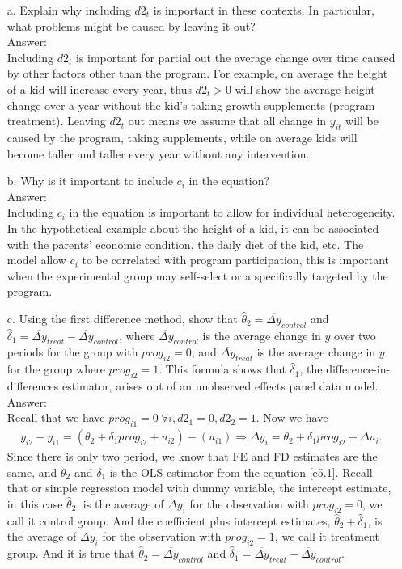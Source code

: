 \documentclass[10pt]{article}
\begin{document}
\begin{enumerate}
\item[a.] Explain why including $d2_t$ is important in these contexts. In particular, what problems might be caused by leaving it out? 
\\ Answer: \\
Including $d2_t$ is important for partial out the average change over time caused by other factors other than the program. For example, on average the height of a kid will increase every year, thus $d2_t>0$ will show the average height change over a year without the kid's taking growth supplements (program treatment). Leaving $d2_t$ out means we assume that all change in $y_{it}$ will be caused by the program, taking supplements, while on average kids will become taller and taller every year without any intervention.

\item[b.] Why is it important to include $c_i$ in the equation?
\\ Answer: \\
Including $c_i$ in the equation is important to allow for individual heterogeneity. In the hypothetical example about the height of a kid, it can be associated with the parents' economic condition, the daily diet of the kid, etc. The model allow $c_i$ to be correlated with program participation, this is important when the experimental group may self-select or a specifically targeted by the program.

\item[c.] Using the first difference method, show that $\hat{\theta}_2=\overline{\Delta y}_{control}$ and $\hat{\delta}_1=\overline{\Delta y}_{treat}-\overline{\Delta y}_{control}$, where $\overline{\Delta y}_{control}$ is the average change in $y$ over two periods for the group with $prog_{i2}=0$, and $\overline{\Delta y}_{treat}$ is the average change in $y$ for the group where $prog_{i2}=1$. This formula shows that $\hat{\delta}_1$, the difference-in-differences estimator, arises out of an unobserved effects panel data model.
\\ Answer: \\
Recall that we have $prog_{i1}=0\ \forall i, d2_1=0, d2_2=1.$ Now we have
\begin{align}
    y_{i2}-y_{i1}=(\theta_2+\delta_1prog_{i2}+u_{i2})-(u_{i1})\Rightarrow \Delta y_i=\theta_2+\delta_1prog_{i2}+\Delta u_i. \label{e5.1}
\end{align}
Since there is only two period, we know that FE and FD estimates are the same, and $\theta_2$ and $\delta_1$ is the OLS estimator from the equation \eqref{e5.1}. Recall that or simple regression model with dummy variable, the intercept estimate, in this case $\hat{\theta}_2$, is the average of $\Delta y_i$ for the observation with $prog_{i2}=0$, we call it control group. And the coefficient plus intercept estimates, $\hat{\theta}_2+\hat{\delta}_1$, is the average of $\Delta y_i$ for the observation with $prog_{i2}=1$, we call it treatment group. And it is true that $\hat{\theta}_2=\overline{\Delta y}_{control}$ and $\hat{\delta}_1=\overline{\Delta y}_{treat}-\overline{\Delta y}_{control}$.


\end{enumerate}
\end{document}
